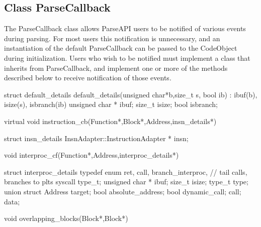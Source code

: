 \subsection{Class ParseCallback}


The ParseCallback class allows ParseAPI users to be notified of various events
during parsing. For most users this notification is unnecessary, and an
instantiation of the default ParseCallback can be passed to the CodeObject during initialization. Users who wish to be notified must implement a class that inherits from ParseCallback, and implement one or more of the methods described below to receive notification of those events.

\begin{apient}
struct default_details {
    default_details(unsigned char*b,size_t s, bool ib) : ibuf(b), isize(s), isbranch(ib) { }
    unsigned char * ibuf;
    size_t isize;
    bool isbranch;
}
\end{apient}

\begin{apient}
virtual void instruction_cb(Function*,Block*,Address,insn_details*)
\end{apient}

\begin{apient}
struct insn_details {
    InsnAdapter::InstructionAdapter * insn;
}
\end{apient}

\begin{apient}
void interproc_cf(Function*,Address,interproc_details*)
\end{apient}

\begin{apient}  
struct interproc_details {
    typedef enum {
        ret,
        call,
        branch_interproc, // tail calls, branches to plts
        syscall
    } type_t;
    unsigned char * ibuf;
    size_t isize;
    type_t type;
    union {
        struct {
            Address target;
            bool absolute_address;
            bool dynamic_call;
        } call;
    } data;
}
\end{apient}

\begin{apient}
void overlapping_blocks(Block*,Block*)
\end{apient}

